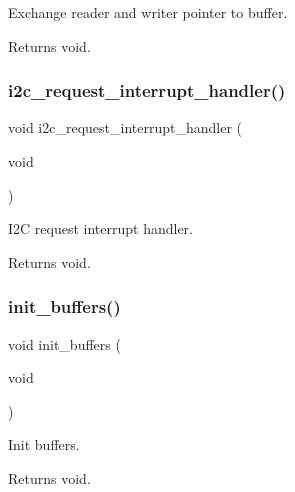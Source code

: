 Exchange reader and writer pointer to buffer. 

\begin{DoxyReturn}{Returns}
void. 
\end{DoxyReturn}
\mbox{\label{i2c-rain_8ino_ac816bd8aafe77e7a571574c8a26eead5}} 
\subsubsection{\texorpdfstring{i2c\+\_\+request\+\_\+interrupt\+\_\+handler()}{i2c\_request\_interrupt\_handler()}}
{\footnotesize\ttfamily void i2c\+\_\+request\+\_\+interrupt\+\_\+handler (\begin{DoxyParamCaption}\item[{void}]{ }\end{DoxyParamCaption})}



I2C request interrupt handler. 

\begin{DoxyReturn}{Returns}
void. 
\end{DoxyReturn}
\mbox{\label{i2c-rain_8ino_ad241cc00b1a92e6d85827df96778e442}} 
\subsubsection{\texorpdfstring{init\+\_\+buffers()}{init\_buffers()}}
{\footnotesize\ttfamily void init\+\_\+buffers (\begin{DoxyParamCaption}\item[{void}]{ }\end{DoxyParamCaption})}



Init buffers. 

\begin{DoxyReturn}{Returns}
void. 
\end{DoxyReturn}
\mbox{\label{i2c-rain_8ino_ad8b80a0c08f928106018edd6ea435b95}} 

